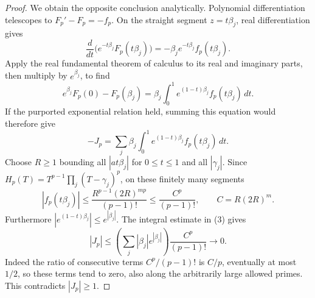 \begin{proof}
We obtain the opposite conclusion analytically. Polynomial
differentiation telescopes to $F_p'-F_p=-f_p$. On the straight
segment $z=t\beta_j$, real differentiation gives
\[
 \frac{d}{dt}\bigl(e^{-t\beta_j}F_p(t\beta_j)\bigr)
       =-\beta_j e^{-t\beta_j}f_p(t\beta_j).
\]
Apply the real fundamental theorem of calculus to its real and
imaginary parts, then multiply by $e^{\beta_j}$, to find
\[
 e^{\beta_j}F_p(0)-F_p(\beta_j)
   =\beta_j\int_0^1 e^{(1-t)\beta_j}f_p(t\beta_j)\,dt.
\]
If the purported exponential relation held, summing this equation
would therefore give
\[
 -J_p=\sum_j\beta_j\int_0^1
           e^{(1-t)\beta_j}f_p(t\beta_j)\,dt.       \tag{3}
\]
Choose $R\ge1$ bounding all $|a t\beta_j|$ for $0\le t\le1$
and all $|\gamma_j|$. Since $H_p(T)=T^{p-1}\prod_j(T-\gamma_j)^p$,
on these finitely many segments
\[
 |f_p(t\beta_j)|
 \le \frac{R^{p-1}(2R)^{mp}}{(p-1)!}
 \le \frac{C^p}{(p-1)!},\qquad C=R(2R)^m.
\]
Furthermore $|e^{(1-t)\beta_j}|\le e^{|\beta_j|}$. The integral
estimate in (3) gives
\[
 |J_p|\le
 \left(\sum_j|\beta_j|e^{|\beta_j|}\right)
       \frac{C^p}{(p-1)!}\longrightarrow0.
\]
Indeed the ratio of consecutive terms $C^p/(p-1)!$ is $C/p$,
eventually at most $1/2$, so these terms tend to zero, also along
the arbitrarily large allowed primes. This contradicts $|J_p|\ge1$.
\end{proof}

